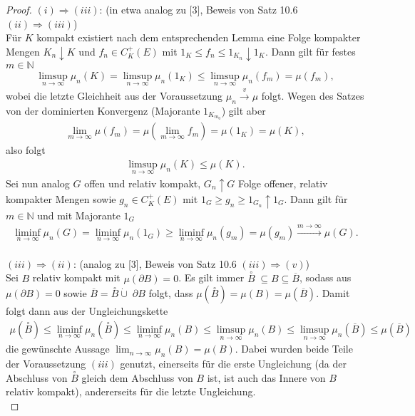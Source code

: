 \documentclass[twoside]{article}
\theoremstyle{definition}
\begin{document}
\begin{proof}
$(i) \Longrightarrow (iii)$: (in etwa analog zu [3], Beweis von Satz 10.6 $(ii) \Longrightarrow (iii)$)\\
Für $K$ kompakt existiert nach dem entsprechenden Lemma eine Folge kompakter Mengen $K_n \downarrow K$ und $f_n \in C_K^+(E)$ mit $1_K \leq f_n \leq 1_{K_n} \downarrow 1_K$. Dann gilt für festes $m \in \mathbb{N}$
\begin{align}
\limsup_{n \to \infty} \mu_n(K) = \limsup_{n \to \infty} \mu_n(1_K) \leq \limsup_{n \to \infty} \mu_n(f_m) = \mu(f_m) ,
\end{align}
wobei die letzte Gleichheit aus der Voraussetzung $\mu_n \xrightarrow{v} \mu$ folgt. Wegen des Satzes von der dominierten Konvergenz (Majorante $1_{K_{m_0}}$) gilt aber
\begin{align}
\lim_{m \to \infty} \mu(f_m) = \mu\left(\lim_{m \to \infty} f_m \right) = \mu(1_K) = \mu(K),
\end{align}
also folgt 
\begin{align}
\limsup_{n \to \infty} \mu_n(K) \leq \mu(K).
\end{align}
Sei nun analog $G$ offen und relativ kompakt, $G_n \uparrow G$ Folge offener, relativ kompakter Mengen sowie $g_n \in C_K^+(E)$ mit $1_G \geq g_n \geq 1_{G_n} \uparrow 1_G$. Dann gilt für $m \in \mathbb{N}$ und mit Majorante $1_G$
\begin{align}
\liminf_{n \to \infty} \mu_n(G) = \liminf_{n \to \infty} \mu_n(1_G) \geq \liminf_{n \to \infty} \mu_n(g_m) = \mu(g_m) \xrightarrow{m \to \infty} \mu(G).
\end{align}\\

$(iii) \Longrightarrow (ii)$: (analog zu [3], Beweis von Satz 10.6 $(iii) \Longrightarrow (v)$)\\
Sei $B$ relativ kompakt mit $\mu(\partial B) = 0$. Es gilt immer $\stackrel{\circ}{B} \; \subseteq B \subseteq \overline{B}$, sodass aus $\mu(\partial B) = 0$ sowie $\overline{B} = \stackrel{\circ}{B}  \dot{\cup} \; \partial B$ folgt, dass $\mu(\stackrel{\circ}{B}) = \mu(B) = \mu(\overline{B})$. Damit folgt dann aus der Ungleichungskette
\begin{align}
\mu(\stackrel{\circ}{B}) 
\leq \liminf_{n \to \infty} \mu_n(\stackrel{\circ}{B}) 
\leq \liminf_{n \to \infty} \mu_n(B) 
\leq \limsup_{n \to \infty} \mu_n(B)
\leq \limsup_{n \to \infty} \mu_n(\overline{B})
\leq \mu(\overline{B})
\end{align}
die gewünschte Aussage $\lim_{n \to \infty} \mu_n(B) = \mu(B)$. Dabei wurden beide Teile der Voraussetzung $(iii)$ genutzt, einerseits für die erste Ungleichung (da der Abschluss von $\stackrel{\circ}{B}$ gleich dem Abschluss von $B$ ist, ist auch das Innere von $B$ relativ kompakt), andererseits für die letzte Ungleichung.\\


\end{proof}
\end{document}
